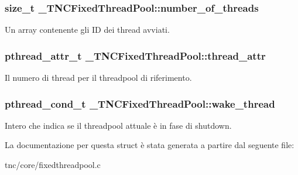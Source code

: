 \subsubsection[{number\+\_\+of\+\_\+threads}]{\setlength{\rightskip}{0pt plus 5cm}size\+\_\+t \+\_\+\+T\+N\+C\+Fixed\+Thread\+Pool\+::number\+\_\+of\+\_\+threads}\label{struct__TNCFixedThreadPool_a228f1fcdc9d0d0fa0f8f895857fe18f2}


Un array contenente gli I\+D dei thread avviati. 

\hypertarget{struct__TNCFixedThreadPool_afa711fbf4bf7739ba09bada86c75df88}{}
\subsubsection[{thread\+\_\+attr}]{\setlength{\rightskip}{0pt plus 5cm}pthread\+\_\+attr\+\_\+t \+\_\+\+T\+N\+C\+Fixed\+Thread\+Pool\+::thread\+\_\+attr}\label{struct__TNCFixedThreadPool_afa711fbf4bf7739ba09bada86c75df88}


Il numero di thread per il threadpool di riferimento. 

\hypertarget{struct__TNCFixedThreadPool_a7eea3eb946adb606f4859199b2c6fff5}{}
\subsubsection[{wake\+\_\+thread}]{\setlength{\rightskip}{0pt plus 5cm}pthread\+\_\+cond\+\_\+t \+\_\+\+T\+N\+C\+Fixed\+Thread\+Pool\+::wake\+\_\+thread}\label{struct__TNCFixedThreadPool_a7eea3eb946adb606f4859199b2c6fff5}


Intero che indica se il threadpool attuale è in fase di shutdown. 



La documentazione per questa struct è stata generata a partire dal seguente file\+:\begin{DoxyCompactItemize}
\item 
tnc/core/fixedthreadpool.\+c\end{DoxyCompactItemize}
